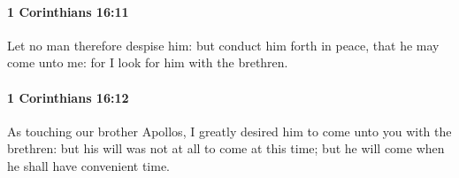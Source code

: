 		\paragraph{1 Corinthians 16:11} %
			\label{1CORINTHIANS-16-11}

			Let no man therefore despise him: but conduct him forth in peace, that he may come unto me: for I look for him with the brethren.

			\begin{framed}
				\scriptsize
				\begin{compactdesc}
					\item[SBLG] 
				\end{compactdesc}
			\end{framed}

		\paragraph{1 Corinthians 16:12} %
			\label{1CORINTHIANS-16-12}

			As touching our brother Apollos, I greatly desired him to come unto you with the brethren: but his will was not at all to come at this time; but he will come when he shall have convenient time.

